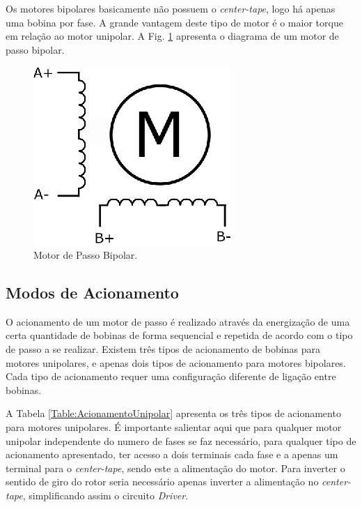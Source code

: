 Os motores bipolares basicamente não possuem o \emph{center-tape}, logo há apenas uma bobina por fase. A grande vantagem deste tipo de motor é o maior torque em relação ao motor unipolar. A Fig. \ref{fig:MotorDePassoBipolar} apresenta o diagrama de um motor de passo bipolar.

\begin{figure}[H]
	\centering
	\includegraphics[width = 0.3\columnwidth]{images/MotorDePassoBipolar.eps}
	\caption{Motor de Passo Bipolar.}
	\label{fig:MotorDePassoBipolar}
\end{figure}


\subsection{Modos de Acionamento} 

O acionamento de um motor de passo é realizado através da energização de uma certa quantidade de bobinas de forma sequencial e repetida de acordo com o tipo de passo a se realizar. Existem três tipos de acionamento de bobinas para motores unipolares, e apenas dois tipos de acionamento para motores bipolares. Cada tipo de acionamento requer uma configuração diferente de ligação entre bobinas.

A Tabela \ref{Table:AcionamentoUnipolar} apresenta os três tipos de acionamento para motores unipolares. É importante salientar aqui que  para qualquer motor unipolar independente do numero de fases se faz necessário, para qualquer tipo de acionamento apresentado, ter acesso a dois terminais cada fase e a apenas um terminal para o \emph{center-tape}, sendo este a alimentação do motor. Para inverter o sentido de giro do rotor seria necessário apenas inverter a alimentação no \emph{center-tape}, simplificando assim o circuito \emph{Driver}. 

